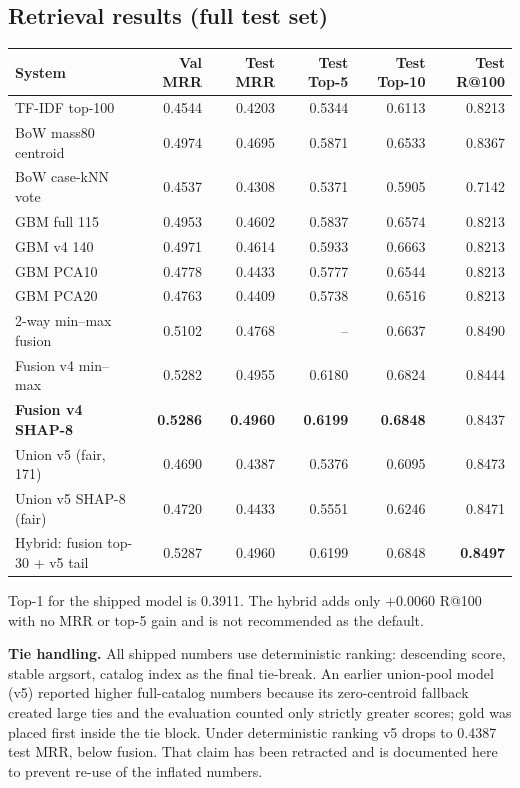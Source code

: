 \documentclass[11pt,a4paper]{article}
\begin{document}
\subsection{Retrieval results (full test set)}
\label{sec:retrieval-results}

\begin{center}
\begin{tabular}{lrrrrr}
\toprule
System & Val MRR & Test MRR & Test Top-5 & Test Top-10 & Test R@100\\
\midrule
TF-IDF top-100 & 0.4544 & 0.4203 & 0.5344 & 0.6113 & 0.8213\\
BoW mass80 centroid & 0.4974 & 0.4695 & 0.5871 & 0.6533 & 0.8367\\
BoW case-kNN vote & 0.4537 & 0.4308 & 0.5371 & 0.5905 & 0.7142\\
GBM full 115 & 0.4953 & 0.4602 & 0.5837 & 0.6574 & 0.8213\\
GBM v4 140 & 0.4971 & 0.4614 & 0.5933 & 0.6663 & 0.8213\\
GBM PCA10 & 0.4778 & 0.4433 & 0.5777 & 0.6544 & 0.8213\\
GBM PCA20 & 0.4763 & 0.4409 & 0.5738 & 0.6516 & 0.8213\\
2-way min--max fusion & 0.5102 & 0.4768 & -- & 0.6637 & 0.8490\\
Fusion v4 min--max & 0.5282 & 0.4955 & 0.6180 & 0.6824 & 0.8444\\
\textbf{Fusion v4 SHAP-8} & \textbf{0.5286} & \textbf{0.4960} & \textbf{0.6199} & \textbf{0.6848} & 0.8437\\
Union v5 (fair, 171) & 0.4690 & 0.4387 & 0.5376 & 0.6095 & 0.8473\\
Union v5 SHAP-8 (fair) & 0.4720 & 0.4433 & 0.5551 & 0.6246 & 0.8471\\
Hybrid: fusion top-30 + v5 tail & 0.5287 & 0.4960 & 0.6199 & 0.6848 & \textbf{0.8497}\\
\bottomrule
\end{tabular}
\end{center}
{\footnotesize Top-1 for the shipped model is 0.3911. The hybrid adds only
$+0.0060$ R@100 with no MRR or top-5 gain and is not recommended as the default.}

\textbf{Tie handling.} All shipped numbers use deterministic ranking: descending
score, stable argsort, catalog index as the final tie-break. An earlier union-pool
model (v5) reported higher full-catalog numbers because its zero-centroid fallback
created large ties and the evaluation counted only strictly greater scores; gold
was placed first inside the tie block. Under deterministic ranking v5 drops to
0.4387 test MRR, below fusion. That claim has been retracted and is documented here
to prevent re-use of the inflated numbers.
\end{document}
